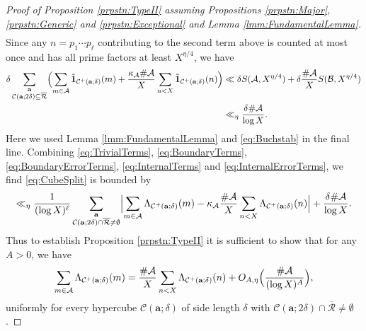 \documentclass[10pt]{amsart}
\theoremstyle{plain}
\numberwithin{sblmm}{thrm}
\numberwithin{equation}{section}
\begin{document}
\begin{proof}[Proof of Proposition \ref{prpstn:TypeII} assuming Propositions \ref{prpstn:Major}, \ref{prpstn:Generic} and \ref{prpstn:Exceptional} and  Lemma \ref{lmm:FundamentalLemma}]
\begin{align}
\label{eq:InternalTerms}
\end{align}
Since any $n=p_1\cdots p_\ell$ contributing to the second term above is counted at most once and has all prime factors at least $X^{\eta/4}$, we have
\begin{align}
\delta\sum_{\substack{\mathbf{a}\\ \mathcal{C}(\mathbf{a};2\delta)\subseteq\overline{\mathcal{R}}} }\Bigl(\sum_{m\in\mathcal{A}}\tilde{\mathbf{1}}_{\mathcal{C}^+(\mathbf{a};\delta)}(m)+\frac{\kappa_\mathcal{A}\#\mathcal{A}}{X}\sum_{n< X}\tilde{\mathbf{1}}_{\mathcal{C}^+(\mathbf{a};\delta)}(n)\Bigr)%
&\ll \delta S(\mathcal{A},X^{\eta/4})+\delta\frac{\#\mathcal{A}}{X}S(\mathcal{B},X^{\eta/4})\nonumber\\
&\ll_\eta \frac{\delta \#\mathcal{A}}{\log{X}}.
\label{eq:InternalErrorTerms}
\end{align}
Here we used Lemma \ref{lmm:FundamentalLemma} and \eqref{eq:Buchstab} in the final line. Combining \eqref{eq:TrivialTerms}, \eqref{eq:BoundaryTerms}, \eqref{eq:BoundaryErrorTerms}, \eqref{eq:InternalTerms} and \eqref{eq:InternalErrorTerms}, we find \eqref{eq:CubeSplit} is bounded by
\begin{equation*}
\ll_\eta \frac{1}{(\log{X})^{\ell}}\sum_{\substack{\mathbf{a}\\ \mathcal{C}(\mathbf{a};2\delta)\cap\overline{\mathcal{R}}\ne\emptyset} }\Bigl|\sum_{m\in\mathcal{A}}\Lambda_{\mathcal{C}^+(\mathbf{a};\delta)}(m)-\kappa_\mathcal{A}\frac{\#\mathcal{A}}{X}\sum_{n< X}\Lambda_{\mathcal{C}^+(\mathbf{a};\delta)}(n)\Bigr|+\frac{\delta\#\mathcal{A}}{\log{X}}.
\end{equation*}
%
%
%
%
Thus to establish Proposition \ref{prpstn:TypeII} it is sufficient to show that for any $A>0$, we have
\begin{equation}
\sum_{\substack{m\in\mathcal{A}}}\Lambda_{\mathcal{C}^+(\mathbf{a};\delta)}(m)=\frac{\#\mathcal{A}}{X}\sum_{n<  X}\Lambda_{\mathcal{C}^+(\mathbf{a};\delta)}(n)+O_{A,\eta}\Bigl(\frac{\#\mathcal{A}}{(\log{X})^A}\Bigr),
\label{eq:CubeSum}
\end{equation}
uniformly for every hypercube $\mathcal{C}(\mathbf{a};\delta)$ of side length $\delta$ with $\mathcal{C}(\mathbf{a};2\delta)\cap\overline{\mathcal{R}}\ne\emptyset$. 


\end{proof}
\end{document}
